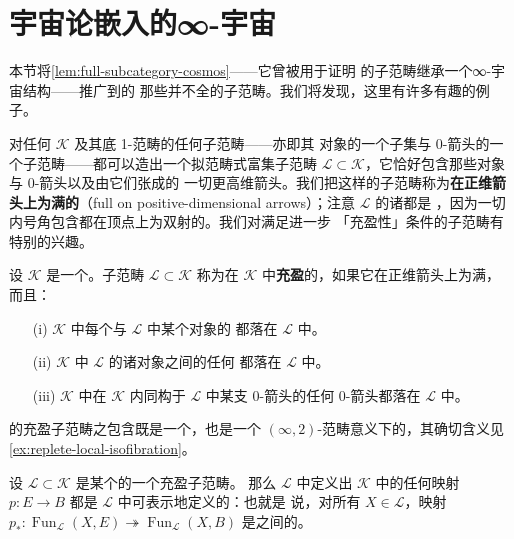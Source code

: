 \providecommand{\Fun}{\operatorname{Fun}}
\providecommand{\qcOne}{\mathbf{1}}   %
\providecommand{\qcTwo}{\mathbf{2}}   %
\providecommand{\hciso}{\mathbb{I}}    %
\providecommand{\Rari}{\mathcal{R}ari}     %
\providecommand{\Lari}{\mathcal{L}ari}     %

\section{宇宙论嵌入的∞-宇宙}\label{sec:cosmologically-embedded-cosmoi}

本节将\cref{lem:full-subcategory-cosmos}——它曾被用于证明\trDiscrete{}
\trInfinityCategory{}的子范畴继承一个∞-宇宙结构——推广到\trInfinityCosmos{}的
那些并不全的子范畴。我们将发现，这里有许多有趣的例子。

对任何\trInfinityCosmos{} $\mathcal{K}$ 及其底 1-范畴的任何子范畴——亦即其
对象的一个子集与 0-箭头的一个子范畴——都可以造出一个拟范畴式富集子范畴
$\mathcal{L}\subset\mathcal{K}$，它恰好包含那些对象与 0-箭头以及由它们张成的
一切更高维箭头。我们把这样的子范畴称为\textbf{在正维箭头上为满的}（full on
positive-dimensional arrows）；注意 $\mathcal{L}$ 的诸\trFunctorSpace{}都是%
\trQuasiCategory{}，因为一切内号角包含都在顶点上为双射的。我们对满足进一步
「充盈性」条件的子范畴有特别的兴趣。

\begin{definition}\label{def:replete-subcategory}
设 $\mathcal{K}$ 是一个\trInfinityCosmos{}。子范畴 $\mathcal{L}\subset\mathcal{K}$
称为在 $\mathcal{K}$ 中\textbf{充盈}的，如果它在正维箭头上为满，而且：
\begin{itemize}
\item[(i)] $\mathcal{K}$ 中每个与 $\mathcal{L}$ 中某个对象\trEquivalence{}的%
\trInfinityCategory{}都落在 $\mathcal{L}$ 中。
\item[(ii)] $\mathcal{K}$ 中 $\mathcal{L}$ 的诸对象之间的任何\trEquivalence{}%
都落在 $\mathcal{L}$ 中。
\item[(iii)] $\mathcal{K}$ 中在 $\mathcal{K}$ 内同构于 $\mathcal{L}$ 中某支
0-箭头的任何 0-箭头都落在 $\mathcal{L}$ 中。
\end{itemize}
\end{definition}

\trInfinityCosmos{}的充盈子范畴之包含既是一个\trMonomorphism{}，也是一个
$(\infty,2)$-范畴意义下的\trIsofibration{}，其确切含义见
\cref{ex:replete-local-isofibration}。

\begin{lemma}\label{lem:replete-representable-isofibration}
设 $\mathcal{L}\subset\mathcal{K}$ 是某个\trInfinityCosmos{}的一个充盈子范畴。
那么 $\mathcal{L}$ 中定义出 $\mathcal{K}$ 中\trIsofibration{}的任何映射
$p\colon E\to B$ 都是 $\mathcal{L}$ 中可表示地定义的\trIsofibration{}：也就是
说，对所有 $X\in\mathcal{L}$，映射
$p_{*}\colon\Fun_{\mathcal{L}}(X,E)\twoheadrightarrow\Fun_{\mathcal{L}}(X,B)$
是\trQuasiCategory{}之间的\trIsofibration{}。
\end{lemma}


